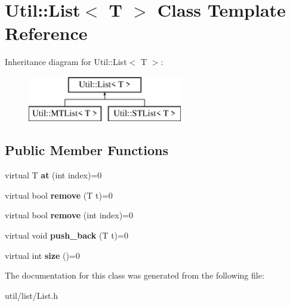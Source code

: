 \hypertarget{class_util_1_1_list}{}\section{Util\+:\+:List$<$ T $>$ Class Template Reference}
\label{class_util_1_1_list}
Inheritance diagram for Util\+:\+:List$<$ T $>$\+:\begin{figure}[H]
\begin{center}
\leavevmode
\includegraphics[height=2.000000cm]{class_util_1_1_list}
\end{center}
\end{figure}
\subsection*{Public Member Functions}
\begin{DoxyCompactItemize}
\item 
\mbox{\label{class_util_1_1_list_a2a86bc77ae5dd6ace5770664acad9d77}} 
virtual T {\bfseries at} (int index)=0
\item 
\mbox{\label{class_util_1_1_list_a762c1a9516ac1da67fbc49ffa134ea89}} 
virtual bool {\bfseries remove} (T t)=0
\item 
\mbox{\label{class_util_1_1_list_a7619f2ffda6b42c87d19cfce4dc777a0}} 
virtual bool {\bfseries remove} (int index)=0
\item 
\mbox{\label{class_util_1_1_list_a1b01b9b733e9f1fff71e117f7dd247b7}} 
virtual void {\bfseries push\+\_\+back} (T t)=0
\item 
\mbox{\label{class_util_1_1_list_a2d41f217eb8af34c90f6f616554a4345}} 
virtual int {\bfseries size} ()=0
\end{DoxyCompactItemize}


The documentation for this class was generated from the following file\+:\begin{DoxyCompactItemize}
\item 
util/list/List.\+h\end{DoxyCompactItemize}
